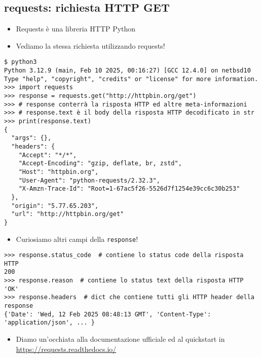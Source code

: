 \documentclass{beamer}
\newcommand{\code}[1]{\mbox{\texttt{#1}}}
\begin{document}
\subsection*{requests: richiesta HTTP GET}
\begin{frame}{\insertsection}{\insertsubsection}
\begin{itemize}
\item \alert{Requests} è una libreria HTTP Python
\item Vediamo la stessa richiesta utilizzando requests!
\end{itemize}
{\tiny
\begin{verbatim}
$ python3
Python 3.12.9 (main, Feb 10 2025, 00:16:27) [GCC 12.4.0] on netbsd10
Type "help", "copyright", "credits" or "license" for more information.
>>> import requests
>>> response = requests.get("http://httpbin.org/get")
>>> # response conterrà la risposta HTTP ed altre meta-informazioni
>>> # response.text è il body della risposta HTTP decodificato in str
>>> print(response.text)  
{
  "args": {},
  "headers": {
    "Accept": "*/*",
    "Accept-Encoding": "gzip, deflate, br, zstd",
    "Host": "httpbin.org",
    "User-Agent": "python-requests/2.32.3",
    "X-Amzn-Trace-Id": "Root=1-67ac5f26-5526d7f1254e39cc6c30b253"
  },
  "origin": "5.77.65.203",
  "url": "http://httpbin.org/get"
}

\end{verbatim}
}
\begin{itemize}
\item Curiosiamo altri campi della \code{response}!
\end{itemize}
{\tiny
\begin{verbatim}
>>> response.status_code  # contiene lo status code della risposta HTTP
200
>>> response.reason  # contiene lo status text della risposta HTTP
'OK'
>>> response.headers  # dict che contiene tutti gli HTTP header della response
{'Date': 'Wed, 12 Feb 2025 08:48:13 GMT', 'Content-Type': 'application/json', ... }
\end{verbatim}
}
\begin{itemize}
\item Diamo un'occhiata alla documentazione ufficiale ed al quickstart in
\url{https://requests.readthedocs.io/}
\end{itemize}
\end{frame}
\end{document}
